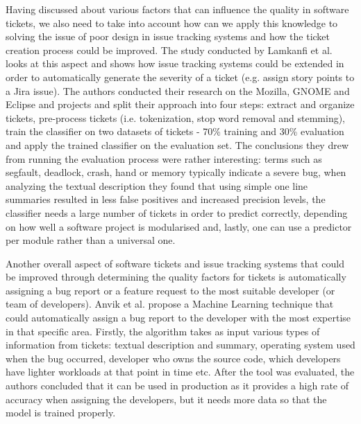 \documentclass{mpaper}
\begin{document}
Having discussed about various factors that can influence the quality in software tickets, 
we also need to take into account how can we apply this knowledge to solving the issue of 
poor design in issue tracking systems and how the ticket creation process could be improved. 
The study conducted by Lamkanfi et al. \cite{lamkanfi2010predicting} looks at this aspect and
shows how issue tracking systems could be extended in order to automatically generate the severity 
of a ticket (e.g. assign story points to a Jira issue). The authors conducted their research on the Mozilla,
GNOME and Eclipse and projects and split their approach into four steps: extract and organize tickets, 
pre-process tickets (i.e. tokenization, stop word removal and stemming), train the classifier on two datasets 
of tickets - 70\% training and 30\% evaluation and apply the trained classifier on the evaluation set.
The conclusions they drew from running the evaluation process were rather 
interesting: terms such as segfault, deadlock, crash, hand or memory typically indicate
a severe bug, when analyzing the textual description they found that using simple
one line summaries resulted in less false positives and increased precision
levels, the classifier needs a large number of tickets in order to predict correctly, 
depending on how well a software project is modularised and, lastly, one can 
use a predictor per module rather than a universal one.

Another overall aspect of software tickets and issue tracking systems that could be improved through 
determining the quality factors for tickets is automatically assigning a bug report or a feature request 
to the most suitable developer (or team of developers). Anvik et al. \cite{anvik2011reducing}
propose a Machine Learning technique that could automatically assign a bug report to the developer 
with the most expertise in that specific area. Firstly, the algorithm takes as input various types of information from 
tickets: textual description and summary, operating system used when the bug occurred, developer 
who owns the source code, which developers have lighter workloads at that point in time etc. After the 
tool was evaluated, the authors concluded that it can be used in production as it provides a high 
rate of accuracy when assigning the developers, but it needs more data so that the model is trained 
properly.
\end{document}
